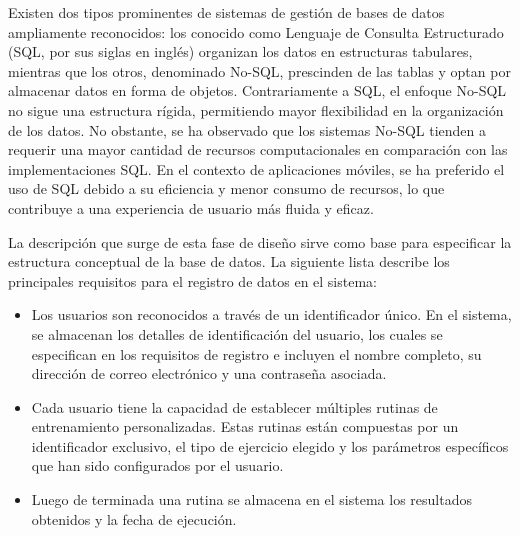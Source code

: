 \newpage
{}
Existen dos tipos prominentes de sistemas de gestión de bases de datos ampliamente reconocidos: los conocido como Lenguaje de Consulta Estructurado (SQL, por sus siglas en inglés) organizan los datos en estructuras tabulares, mientras que los otros, denominado No-SQL, prescinden de las tablas y optan por almacenar datos en forma de objetos. Contrariamente a SQL, el enfoque No-SQL no sigue una estructura rígida, permitiendo mayor flexibilidad en la organización de los datos. No obstante, se ha observado que los sistemas No-SQL tienden a requerir una mayor cantidad de recursos computacionales en comparación con las implementaciones SQL. En el contexto de aplicaciones móviles, se ha preferido el uso de SQL debido a su eficiencia y menor consumo de recursos, lo que contribuye a una experiencia de usuario más fluida y eficaz.

\vspace{5pt}
La descripción que surge de esta fase de diseño sirve como base para especificar la estructura conceptual de la base de datos. 
La siguiente lista describe los principales requisitos para el registro de datos en el sistema:
\begin{itemize}
    \item Los usuarios son reconocidos a través de un identificador único. En el sistema, se almacenan los detalles de identificación del usuario, los cuales se especifican en los requisitos de registro e incluyen el nombre completo, su dirección de correo electrónico y una contraseña asociada.
    \item Cada usuario tiene la capacidad de establecer múltiples rutinas de entrenamiento personalizadas. Estas rutinas están compuestas por un identificador exclusivo, el tipo de ejercicio elegido y los parámetros específicos que han sido configurados por el usuario. 
    \item Luego de terminada una rutina se almacena en el sistema los resultados obtenidos y la fecha de ejecución. 
\end{itemize}   
    
